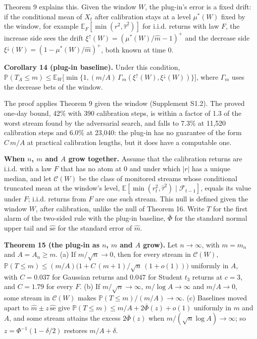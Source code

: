 \documentclass[
]{article}
\begin{document}
Theorem 9 explains this. Given the window \(W\), the plug-in's error is
a fixed drift: if the conditional mean of \(X_t\) after calibration
stays at a level \(\mu^\ast(W)\) fixed by the window, for example
\(\mathbb{E}_F[\min(r^2, \hat\tau^2)]\) for i.i.d. returns with law
\(F\), the increase side sees the drift
\(\xi^{\uparrow}(W) = (\mu^\ast(W)/\hat m - 1)^+\) and the decrease side
\(\xi^{\downarrow}(W) = (1 - \mu^\ast(W)/\hat m)^+\), both known at time
0.

\textbf{Corollary 14 (plug-in baseline).} Under this condition,
\(\mathbb{P}(T_A \le m) \le \mathbb{E}_W\big[\min\lbrace 1, (m/A)\,\Gamma_m(\xi^{\uparrow}(W), \xi^{\downarrow}(W))\rbrace\big]\),
where \(\Gamma_m\) uses the decrease bets of the window.

The proof applies Theorem 9 given the window (Supplement S1.2). The
proved one-day bound, 42\% with 390 calibration steps, is within a
factor of 1.3 of the worst stream found by the adversarial search, and
falls to 7.3\% at 11,520 calibration steps and 6.0\% at 23,040: the
plug-in has no guarantee of the form \(C\,m/A\) at practical calibration
lengths, but it does have a computable one.

\textbf{When \(n\), \(m\) and \(A\) grow together.} Assume that the
calibration returns are i.i.d. with a law \(F\) that has no atom at 0
and under which \(\lvert r\rvert\) has a unique median, and let
\(\mathcal{C}(W)\) be the class of monitored streams whose conditional
truncated mean at the window's level,
\(\mathbb{E}[\min(r_t^2, \hat\tau^2) \mid \mathcal{F}_{t-1}]\), equals
its value under \(F\); i.i.d. returns from \(F\) are one such stream.
This null is defined given the window \(W\), after calibration, unlike
the null of Theorem 16. Write \(T\) for the first alarm of the two-sided
rule with the plug-in baseline, \(\bar\Phi\) for the standard normal
upper tail and \(\widehat{\mathrm{se}}\) for the standard error of
\(\hat m\).

\textbf{Theorem 15 (the plug-in as \(n\), \(m\) and \(A\) grow).} Let
\(n \to \infty\), with \(m = m_n\) and \(A = A_n \ge m\). (a) If
\(m/\sqrt n \to 0\), then for every stream in \(\mathcal{C}(W)\),
\(\mathbb{P}(T \le m) \le (m/A)\big(1 + C\,(m+1)/\sqrt n\,(1 + o(1))\big)\)
uniformly in \(A\), with \(C = 0.037\) for Gaussian returns and
\(0.047\) for Student \(t_3\) returns at \(c = 3\), and \(C = 1.79\) for
every \(F\). (b) If \(m/\sqrt n \to \infty\), \(m/\log A \to \infty\)
and \(m/A \to 0\), some stream in \(\mathcal{C}(W)\) makes
\(\mathbb{P}(T \le m)/(m/A) \to \infty\). (c) Baselines moved apart to
\(\hat m \pm z\,\widehat{\mathrm{se}}\) give
\(\mathbb{P}(T \le m) \le m/A + 2\bar\Phi(z) + o(1)\) uniformly in \(m\)
and \(A\), and some stream attains the excess \(2\bar\Phi(z)\) when
\(m/(\sqrt n \log A) \to \infty\); so \(z = \Phi^{-1}(1 - \delta/2)\)
restores \(m/A + \delta\).
\end{document}
